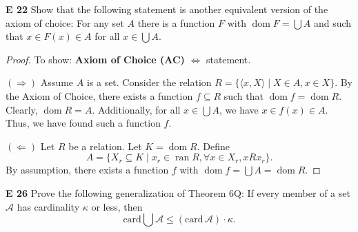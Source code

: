 \begin{question}
    \textbf{E 22} 
    Show that the following statement is another equivalent version of the axiom of choice: For any set \(A\) there is a function \(F\) with \(\operatorname{dom} F = \bigcup A\) and such that \(x \in F(x) \in A\) for all \(x \in \bigcup A\).
\end{question}
\begin{proof}
    To show: \textbf{Axiom of Choice (AC)} \(\iff\) statement.

    \((\Rightarrow)\) Assume \(A\) is a set. Consider the relation \(R = \{ \langle x, X \rangle \mid X \in A, x \in X \}\). By the Axiom of Choice, there exists a function \(f \subseteq R\) such that \(\operatorname{dom} f = \operatorname{dom} R\). Clearly, \(\operatorname{dom} R = A\). Additionally, for all \(x \in \bigcup A\), we have \(x \in f(x) \in A\). Thus, we have found such a function \(f\).

    \((\Leftarrow)\) Let \(R\) be a relation. Let \(K = \operatorname{dom} R\). Define
    \[
    A = \{X_r \subseteq K \mid x_r \in \operatorname{ran} R, \forall x \in X_r, x R x_r\}.
    \]
    By assumption, there exists a function \(f\) with \(\operatorname{dom} f = \bigcup A = \operatorname{dom} R\).

\end{proof}

\begin{question}
    \textbf{E 26} 
    Prove the following generalization of Theorem 6Q: If every member of a set \(\mathcal{A}\) has cardinality \(\kappa\) or less, then
    \[
    \mathrm{card} \bigcup \mathcal{A} \leq (\mathrm{card} \, \mathcal{A}) \cdot \kappa.
    \]
\end{question}

